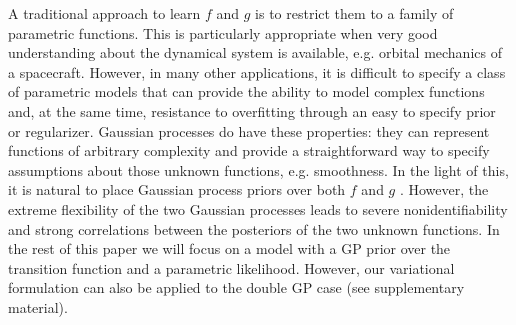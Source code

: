 \documentclass{article} %
\begin{document}
A traditional approach to learn $f$ and $g$ is to restrict them to a family of parametric functions. This is particularly appropriate when very good understanding about the dynamical system is available, e.g. orbital mechanics of a spacecraft. However, in many other applications, it is difficult to specify a class of parametric models that can provide the ability to model complex functions and, at the same time, resistance to overfitting through an easy to specify prior or regularizer. Gaussian processes do have these properties: they can represent functions of arbitrary complexity and provide a straightforward way to specify assumptions about those unknown functions, e.g. smoothness. In the light of this, it is natural to place Gaussian process priors over both $f$ and $g$ \citep{Wang2006}. However, the extreme flexibility of the two Gaussian processes leads to severe nonidentifiability and strong correlations between the posteriors of the two unknown functions. In the rest of this paper we will focus on a model with a GP prior over the transition function and a parametric likelihood. However, our variational formulation can also be applied to the double GP case (see supplementary material).
\end{document}
